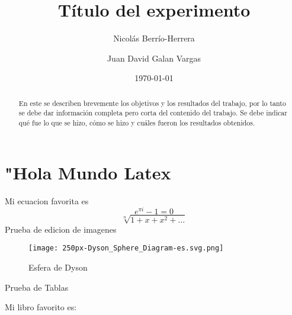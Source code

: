 \documentclass[a4paper, amsfonts, amssymb, amsmath, reprint, showkeys, nofootinbib, twoside]{revtex4-1}
\begin{document}
\title{Título del experimento}


\author{Nicolás Berrío-Herrera}
\author{Juan David Galan Vargas}
  


\date{\today} %

\begin{abstract}

En este se describen brevemente los objetivos y los resultados del trabajo, por lo tanto se debe dar información completa pero corta del contenido del trabajo. Se debe indicar qué fue lo que se hizo, cómo se hizo y cuáles fueron los resultados obtenidos.

\end{abstract}

\maketitle
\section{"Hola Mundo Latex}
Mi ecuacion favorita es $$e^{\pi i} - 1 = 0$$
\begin{equation}
    \sqrt[n]{1+x+x^2+\ldots}
\end{equation}
Prueba de edicion de imagenes
\begin{figure}[H]
    \centering
    \texttt{[image: 250px-Dyson\_Sphere\_Diagram-es.svg.png]}
    \caption{Esfera de Dyson}
    \label{mi primera imagen}
\end{figure}
Prueba de Tablas
\begin{table}[H]
\end{table}
Mi libro favorito es: \cite{hola,}
\end{document}
